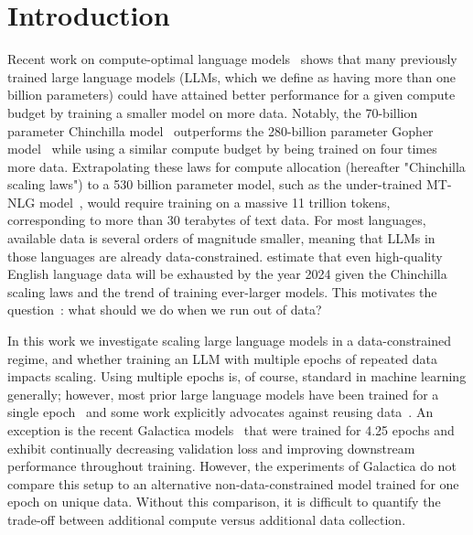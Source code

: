 \documentclass{article}
\begin{document}
\section{Introduction}

Recent work on compute-optimal language models~\cite{hoffmann2022training} shows that many previously trained large language models (LLMs, which we define as having more than one billion parameters) could have attained better performance for a given compute budget by training a smaller model on more data. Notably, the 70-billion parameter Chinchilla model~\cite{hoffmann2022training} outperforms the 280-billion parameter Gopher model~\cite{rae2021scaling} while using a similar compute budget by being trained on four times more data. Extrapolating these laws for compute allocation (hereafter "Chinchilla scaling laws") to a 530 billion parameter model, such as the under-trained MT-NLG model~\cite{smith2022using}, would require training on a massive 11 trillion tokens, corresponding to more than 30 terabytes of text data. For most languages, available data is several orders of magnitude smaller, meaning that LLMs in those languages are already data-constrained. \citet{villalobos2022will} estimate that even high-quality English language data will be exhausted by the year 2024 given the Chinchilla scaling laws and the trend of training ever-larger models.
This motivates the question~\citep{villalobos2022will,nostalgebraist}: what should we do when we run out of data?

In this work we investigate scaling large language models in a data-constrained regime, and whether training an LLM with multiple epochs of repeated data impacts scaling. Using multiple epochs is, of course, standard in machine learning generally; however, most prior large language models have been trained for a single epoch~\citep{komatsuzaki2019one,brown2020language} and some work explicitly advocates against reusing data~\citep{hernandez2022scaling}. An exception is the recent Galactica models~\cite{taylor2022galactica} that were trained for 4.25 epochs and exhibit continually decreasing validation loss and improving downstream performance throughout training. However, the experiments of Galactica do not compare this setup to an alternative non-data-constrained model trained for one epoch on unique data. Without this comparison, it is difficult to quantify the trade-off between additional compute versus additional data collection. 
\end{document}
